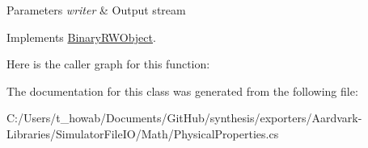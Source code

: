 \begin{DoxyParams}{Parameters}
{\em writer} & Output stream\\
\hline
\end{DoxyParams}


Implements \hyperlink{interface_binary_r_w_object_a5e361e550b30dcd29759188cf67d177c}{Binary\+R\+W\+Object}.

Here is the caller graph for this function\+:


The documentation for this class was generated from the following file\+:\begin{DoxyCompactItemize}
\item 
C\+:/\+Users/t\+\_\+howab/\+Documents/\+Git\+Hub/synthesis/exporters/\+Aardvark-\/\+Libraries/\+Simulator\+File\+I\+O/\+Math/Physical\+Properties.\+cs\end{DoxyCompactItemize}
